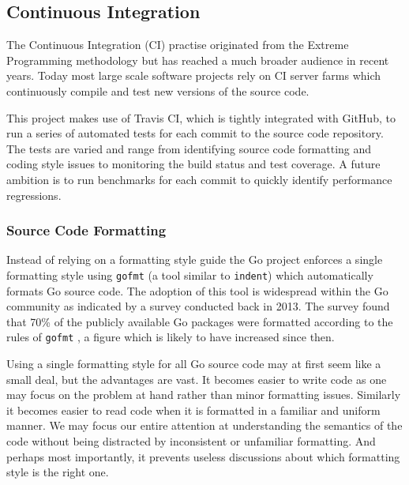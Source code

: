 


\subsection{Continuous Integration}

The Continuous Integration (CI) practise originated from the Extreme Programming methodology \cite{xp} but has reached a much broader audience in recent years. Today most large scale software projects rely on CI server farms which continuously compile and test new versions of the source code.

This project makes use of Travis CI, which is tightly integrated with GitHub, to run a series of automated tests for each commit to the source code repository. The tests are varied and range from identifying source code formatting and coding style issues to monitoring the build status and test coverage. A future ambition is to run benchmarks for each commit to quickly identify performance regressions.

\subsubsection{Source Code Formatting}

Instead of relying on a formatting style guide the Go project enforces a single formatting style using \texttt{gofmt} (a tool similar to \texttt{indent}) which automatically formats Go source code. The adoption of this tool is widespread within the Go community as indicated by a survey conducted back in 2013. The survey found that 70\% of the publicly available Go packages were formatted according to the rules of \texttt{gofmt} \cite{gofmt_70percent}, a figure which is likely to have increased since then.

Using a single formatting style for all Go source code may at first seem like a small deal, but the advantages are vast. It becomes easier to write code as one may focus on the problem at hand rather than minor formatting issues. Similarly it becomes easier to read code when it is formatted in a familiar and uniform manner. We may focus our entire attention at understanding the semantics of the code without being distracted by inconsistent or unfamiliar formatting. And perhaps most importantly, it prevents useless discussions about which formatting style is the right one.

